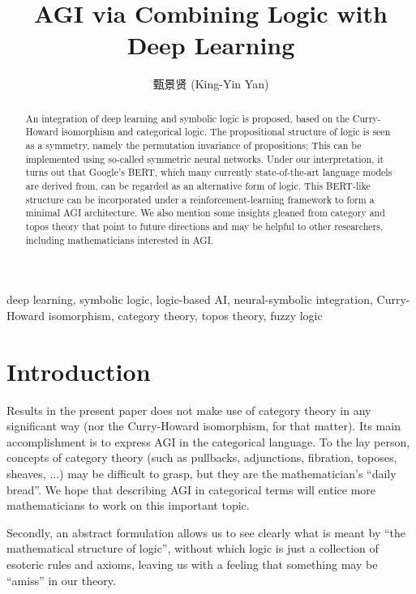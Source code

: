 \documentclass[orivec]{llncs}
\title{AGI via Combining Logic with Deep Learning}
\author{
甄景贤 (King-Yin Yan) 
}
\institute{General.Intelligence@Gmail.com}
\begin{document}
\maketitle

\setlength{\parindent}{0em}
\setlength{\parskip}{2.8ex plus0.8ex minus0.8ex}

\begin{abstract}
An integration of deep learning and symbolic logic is proposed, based on the Curry-Howard isomorphism and categorical logic.  The propositional structure of logic is seen as a symmetry, namely the permutation invariance of propositions;  This can be implemented using so-called symmetric neural networks.  Under our interpretation, it turns out that Google's BERT, which many currently state-of-the-art language models are derived from, can be regarded as an alternative form of logic.  This BERT-like structure can be incorporated under a reinforcement-learning framework to form a minimal AGI architecture.  We also mention some insights gleaned from category and topos theory that point to future directions and may be helpful to other researchers, including mathematicians interested in AGI.
\end{abstract}

\begin{keywords}
deep learning, symbolic logic, logic-based AI, neural-symbolic integration, Curry-Howard isomorphism, category theory, topos theory, fuzzy logic
\end{keywords}

\setcounter{section}{-1}
\section{Introduction}
\label{sec:0}

Results in the present paper does not make use of category theory in any significant way (nor the Curry-Howard isomorphism, for that matter).  Its main accomplishment is to express AGI in the categorical language.  To the lay person, concepts of category theory (such as pullbacks, adjunctions, fibration, toposes, sheaves, ...) may be difficult to grasp, but they are the mathematician's ``daily bread''.  We hope that describing AGI in categorical terms will entice more mathematicians to work on this important topic.

Secondly, an abstract formulation allows us to see clearly what is meant by ``the mathematical structure of logic'', without which logic is just a collection of esoteric rules and axioms, leaving us with a feeling that something may be ``amiss'' in our theory.
\end{document}
